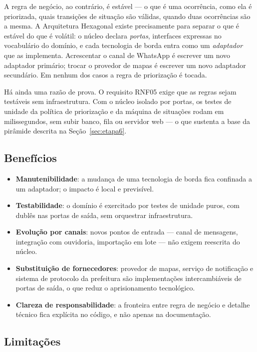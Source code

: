 \documentclass[12pt,a4paper,oneside]{article}
\begin{document}
A regra de negócio, ao contrário, é estável — o que é uma ocorrência, como ela é
priorizada, quais transições de situação são válidas, quando duas ocorrências
são a mesma. A Arquitetura Hexagonal existe precisamente para separar o que é
estável do que é volátil: o núcleo declara \emph{portas}, interfaces expressas
no vocabulário do domínio, e cada tecnologia de borda entra como um
\emph{adaptador} que as implementa. Acrescentar o canal de WhatsApp é escrever
um novo adaptador primário; trocar o provedor de mapas é escrever um novo
adaptador secundário. Em nenhum dos casos a regra de priorização é tocada.

Há ainda uma razão de prova. O requisito RNF05 exige que as regras sejam
testáveis sem infraestrutura. Com o núcleo isolado por portas, os testes de
unidade da política de priorização e da máquina de situações rodam em
milissegundos, sem subir banco, fila ou servidor web — o que sustenta a base da
pirâmide descrita na Seção~\ref{sec:etapa6}.

\subsection{Benefícios}

\begin{itemize}[leftmargin=*,itemsep=3pt,topsep=4pt]
  \item \textbf{Manutenibilidade}: a mudança de uma tecnologia de borda fica
        confinada a um adaptador; o impacto é local e previsível.
  \item \textbf{Testabilidade}: o domínio é exercitado por testes de unidade
        puros, com dublês nas portas de saída, sem orquestrar infraestrutura.
  \item \textbf{Evolução por canais}: novos pontos de entrada — canal de
        mensagens, integração com ouvidoria, importação em lote — não exigem
        reescrita do núcleo.
  \item \textbf{Substituição de fornecedores}: provedor de mapas, serviço de
        notificação e sistema de protocolo da prefeitura são implementações
        intercambiáveis de portas de saída, o que reduz o aprisionamento
        tecnológico.
  \item \textbf{Clareza de responsabilidade}: a fronteira entre regra de negócio
        e detalhe técnico fica explícita no código, e não apenas na
        documentação.
\end{itemize}

\subsection{Limitações}
\end{document}
